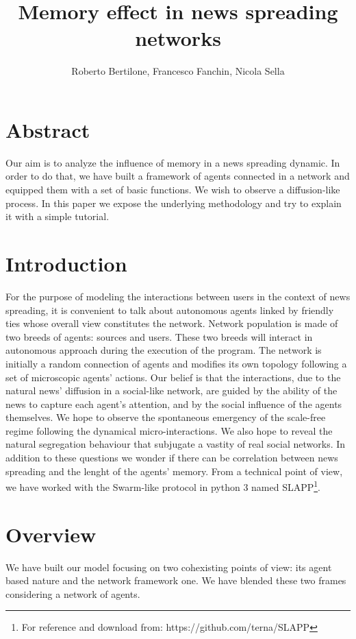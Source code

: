 \documentclass[11pt]{article} %
\title{Memory effect in news spreading networks}
\author{Roberto Bertilone, Francesco Fanchin, Nicola Sella}
\begin{document}
\maketitle

\section*{Abstract}
Our aim is to analyze the influence of memory in a news spreading dynamic. In order to do that, we have built a framework of agents 
connected in a network and equipped them with a set of basic functions. We wish to observe a diffusion-like process.
In this paper we expose the underlying methodology and try to explain it with a simple tutorial.
\section{Introduction}

For the purpose of modeling the interactions between users in the context of news spreading, it is convenient to talk about autonomous agents
linked by friendly ties whose overall view constitutes the network.
Network population is made of two breeds of agents: sources and users. These two breeds will interact
in autonomous approach during the execution of the program.
The network is initially a random connection of agents and modifies its own topology following a set of microscopic agents' actions.
Our belief is that the interactions, due to the natural news' diffusion in a social-like network, are guided by the ability of the news
to capture each agent's attention, and by the social influence of the agents themselves.
We hope to observe the spontaneous emergency of the scale-free regime following the dynamical micro-interactions. We also hope to reveal 
the natural segregation behaviour that subjugate a vastity of real social networks.
In addition to these questions we wonder if there can be correlation between news spreading and the lenght of the agents' memory.
From a technical point of view, we have worked with the Swarm-like protocol in python 3 named SLAPP\footnote{For reference and download from: https://github.com/terna/SLAPP}.

\section{Overview}
We have built our model focusing on two cohexisting points of view: its agent based nature and the network framework one. 
We have blended these two frames considering a network of agents. 
\end{document}
